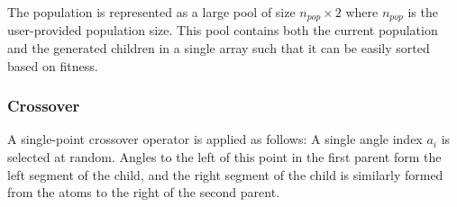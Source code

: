 \documentclass{article}
\begin{document}


The population is represented as a large pool of size $n_{pop} \times 2$ where
$n_{pop}$ is the user-provided population size. This pool contains both the
current population and the generated children in a single array such that it
can be easily sorted based on fitness.



\subsubsection{Crossover}

A single-point crossover operator is applied as follows: A single angle index
$a_i$ is selected at random. Angles to the left of this point in the first
parent form the left segment of the child, and the right segment of the child is
similarly formed from the atoms to the right of the second parent.
\end{document}
